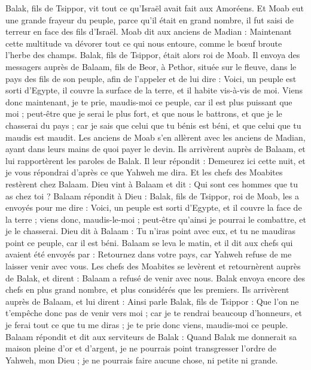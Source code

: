 \begin{multicols}{2}
Balak, fils de Tsippor, vit tout ce qu'Israël avait fait aux Amoréens.
Et Moab eut une grande frayeur du peuple, parce qu'il était en grand nombre, il fut saisi de terreur en face des fils d'Israël.
Moab dit aux anciens de Madian : Maintenant cette multitude va dévorer tout ce qui nous entoure, comme le bœuf broute l'herbe des champs. Balak, fils de Tsippor, était alors roi de Moab.
Il envoya des messagers auprès de Balaam, fils de Beor, à Pethor, située sur le fleuve, dans le pays des fils de son peuple, afin de l'appeler et de lui dire : Voici, un peuple est sorti d'Egypte, il couvre la surface de la terre, et il habite vis-à-vis de moi.
Viens donc maintenant, je te prie, maudis-moi ce peuple, car il est plus puissant que moi ; peut-être que je serai le plus fort, et que nous le battrons, et que je le chasserai du pays ; car je sais que celui que tu bénis est béni, et que celui que tu maudis est maudit.
Les anciens de Moab s'en allèrent avec les anciens de Madian, ayant dans leurs mains de quoi payer le devin. Ils arrivèrent auprès de Balaam, et lui rapportèrent les paroles de Balak.
Il leur répondit : Demeurez ici cette nuit, et je vous répondrai d'après ce que Yahweh me dira. Et les chefs des Moabites restèrent chez Balaam.
Dieu vint à Balaam et dit : Qui sont ces hommes que tu as chez toi ?
Balaam répondit à Dieu : Balak, fils de Tsippor, roi de Moab, les a envoyés pour me dire :
Voici, un peuple est sorti d'Egypte, et il couvre la face de la terre ; viens donc, maudis-le-moi ; peut-être qu'ainsi je pourrai le combattre, et je le chasserai.
Dieu dit à Balaam : Tu n'iras point avec eux, et tu ne maudiras point ce peuple, car il est béni.
Balaam se leva le matin, et il dit aux chefs qui avaient été envoyés par : Retournez dans votre pays, car Yahweh refuse de me laisser venir avec vous.
Les chefs des Moabites se levèrent et retournèrent auprès de Balak, et dirent : Balaam a refusé de venir avec nous.
Balak envoya encore des chefs en plus grand nombre, et plus considérés que les premiers.
Ils arrivèrent auprès de Balaam, et lui dirent : Ainsi parle Balak, fils de Tsippor : Que l'on ne t'empêche donc pas de venir vers moi ;
car je te rendrai beaucoup d'honneurs, et je ferai tout ce que tu me diras ; je te prie donc viens, maudis-moi ce peuple.
Balaam répondit et dit aux serviteurs de Balak : Quand Balak me donnerait sa maison pleine d'or et d'argent, je ne pourrais point transgresser l'ordre de Yahweh, mon Dieu ; je ne pourrais faire aucune chose, ni petite ni grande.

\end{multicols}

